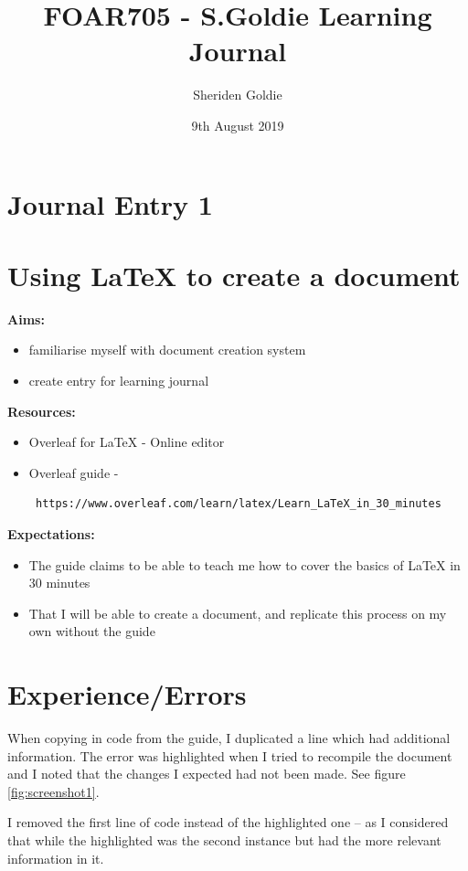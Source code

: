 \documentclass{article}
\title{FOAR705 - S.Goldie Learning Journal}
\author{Sheriden Goldie}
\date{9th August 2019}
\begin{document}
\maketitle
\section*{Journal Entry 1}
\section*{Using LaTeX to create a document}

\textbf{Aims:}
\begin{itemize}
    \item familiarise myself with document creation system
    \item create entry for learning journal
    \end{itemize}

\textbf{Resources:}
\begin{itemize}
    \item Overleaf for LaTeX - Online editor
    \item Overleaf guide - \begin{verbatim} https://www.overleaf.com/learn/latex/Learn_LaTeX_in_30_minutes \end{verbatim}
    \end{itemize}

\textbf{Expectations:}
\begin{itemize}
    \item The guide claims to be able to teach me how to cover the basics of LaTeX in 30 minutes
    \item That I will be able to create a document, and replicate this process on my own without the guide
\end{itemize}


\section*{Experience/Errors}

When copying in code from the guide, I duplicated a line which had additional information. The error was highlighted when I tried to recompile the document and I noted that the changes I expected had not been made.
See figure \ref{fig:screenshot1}.

I removed the first line of code instead of the highlighted one – as I considered that while the highlighted was the second instance but had the more relevant information in it.
\end{document}
